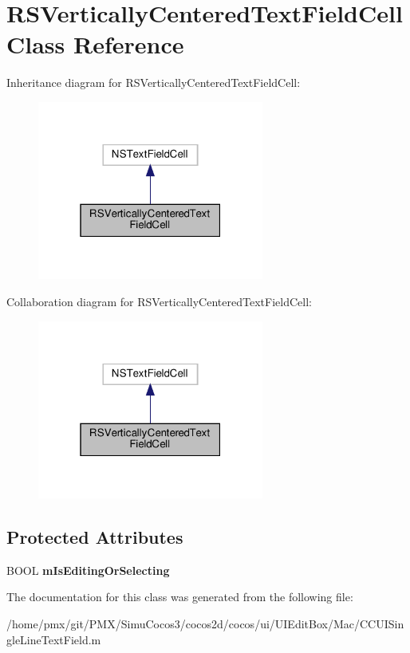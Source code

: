 \hypertarget{interfaceRSVerticallyCenteredTextFieldCell}{}\section{R\+S\+Vertically\+Centered\+Text\+Field\+Cell Class Reference}
\label{interfaceRSVerticallyCenteredTextFieldCell}


Inheritance diagram for R\+S\+Vertically\+Centered\+Text\+Field\+Cell\+:
\nopagebreak
\begin{figure}[H]
\begin{center}
\leavevmode
\includegraphics[width=211pt]{interfaceRSVerticallyCenteredTextFieldCell__inherit__graph}
\end{center}
\end{figure}


Collaboration diagram for R\+S\+Vertically\+Centered\+Text\+Field\+Cell\+:
\nopagebreak
\begin{figure}[H]
\begin{center}
\leavevmode
\includegraphics[width=211pt]{interfaceRSVerticallyCenteredTextFieldCell__coll__graph}
\end{center}
\end{figure}
\subsection*{Protected Attributes}
\begin{DoxyCompactItemize}
\item 
\mbox{\label{interfaceRSVerticallyCenteredTextFieldCell_af3908dce474b3597a17c08defc8aae40}} 
B\+O\+OL {\bfseries m\+Is\+Editing\+Or\+Selecting}
\end{DoxyCompactItemize}


The documentation for this class was generated from the following file\+:\begin{DoxyCompactItemize}
\item 
/home/pmx/git/\+P\+M\+X/\+Simu\+Cocos3/cocos2d/cocos/ui/\+U\+I\+Edit\+Box/\+Mac/C\+C\+U\+I\+Single\+Line\+Text\+Field.\+m\end{DoxyCompactItemize}
